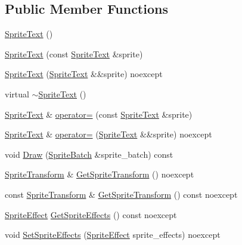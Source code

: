 \subsection*{Public Member Functions}
\begin{DoxyCompactItemize}
\item 
\hyperlink{classmage_1_1_sprite_text_ae55645d53a2f774703603139a80dd84b}{Sprite\+Text} ()
\item 
\hyperlink{classmage_1_1_sprite_text_a6dce7aa2dfa9d63d11e37e41acf82e52}{Sprite\+Text} (const \hyperlink{classmage_1_1_sprite_text}{Sprite\+Text} \&sprite)
\item 
\hyperlink{classmage_1_1_sprite_text_a4a5292d05ad76644d9b914cdc26ce4d6}{Sprite\+Text} (\hyperlink{classmage_1_1_sprite_text}{Sprite\+Text} \&\&sprite) noexcept
\item 
virtual \hyperlink{classmage_1_1_sprite_text_aa30d68a79775dce902c190f2cd298bb4}{$\sim$\+Sprite\+Text} ()
\item 
\hyperlink{classmage_1_1_sprite_text}{Sprite\+Text} \& \hyperlink{classmage_1_1_sprite_text_a727e8c9e79fb0caab58c9121e798467b}{operator=} (const \hyperlink{classmage_1_1_sprite_text}{Sprite\+Text} \&sprite)
\item 
\hyperlink{classmage_1_1_sprite_text}{Sprite\+Text} \& \hyperlink{classmage_1_1_sprite_text_a203a5e33e16d412691d43928809e5a50}{operator=} (\hyperlink{classmage_1_1_sprite_text}{Sprite\+Text} \&\&sprite) noexcept
\item 
void \hyperlink{classmage_1_1_sprite_text_a7db90f9aaebdda3cf9410c11729fd609}{Draw} (\hyperlink{classmage_1_1_sprite_batch}{Sprite\+Batch} \&sprite\+\_\+batch) const
\item 
\hyperlink{classmage_1_1_sprite_transform}{Sprite\+Transform} \& \hyperlink{classmage_1_1_sprite_text_af2d7d48fd0134a9d713c3a4820ac09ba}{Get\+Sprite\+Transform} () noexcept
\item 
const \hyperlink{classmage_1_1_sprite_transform}{Sprite\+Transform} \& \hyperlink{classmage_1_1_sprite_text_aa1b83ca76e72decf0b476d07a9a35c83}{Get\+Sprite\+Transform} () const noexcept
\item 
\hyperlink{namespacemage_ad62ebdf0e7aae0caf1535a4ea3f056ea}{Sprite\+Effect} \hyperlink{classmage_1_1_sprite_text_a2bd9f195c3c31906c2b3dbf276f5bc97}{Get\+Sprite\+Effects} () const noexcept
\item 
void \hyperlink{classmage_1_1_sprite_text_ab457137566eb5a57562c7ff6d387fc93}{Set\+Sprite\+Effects} (\hyperlink{namespacemage_ad62ebdf0e7aae0caf1535a4ea3f056ea}{Sprite\+Effect} sprite\+\_\+effects) noexcept

\end{DoxyCompactItemize}
